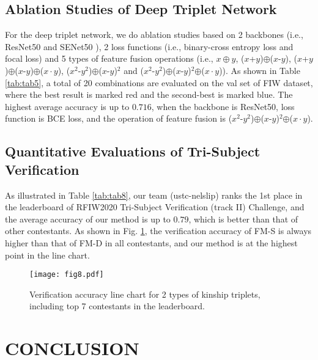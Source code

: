 \documentclass[a4paper, 10pt, conference]{ieeeconf}      %
\begin{document}
\subsection{Ablation Studies of Deep Triplet Network}

For the deep triplet network, we do ablation studies based on 2 backbones (i.e., ResNet50 \cite{c20} and SENet50 \cite{c21}), 2 loss functions (i.e., binary-cross entropy loss and focal loss) and 5 types of feature fusion operations (i.e., $x \oplus y$, ($x$+$y$)$\oplus$($x$-$y$), ($x$+$y$)$\oplus$($x$-$y$)$\oplus$($x\cdot y$), ($x^2$-$y^2$)$\oplus$($x$-$y$)$^2$ and ($x^2$-$y^2$)$\oplus$($x$-$y$)$^2$$\oplus$($x\cdot y$)). As shown in Table \ref{tab:tab5}, a total of 20 combinations are evaluated on the val set of FIW dataset, where the best result is marked red and the second-best is marked blue. The highest average accuracy is up to $0.716$, when the backbone is ResNet50, loss function is BCE loss, and the operation of feature fusion is ($x^2$-$y^2$)$\oplus$($x$-$y$)$^2$$\oplus$($x\cdot y$).


\subsection{Quantitative Evaluations of Tri-Subject Verification}

As illustrated in Table \ref{tab:tab8}, our team (ustc-nelslip) ranks the 1st place in the leaderboard of RFIW2020 Tri-Subject Verification (track II) Challenge, and the average accuracy of our method is up to $0.79$, which is better than that of other contestants. As shown in  Fig. \ref{fig:fig8}, the verification accuracy of FM-S is always higher than that of FM-D in all contestants, and our method is at the highest point in the line chart.

\begin{figure}[t]
\setlength{\abovecaptionskip}{0.1cm}
\setlength{\belowcaptionskip}{0.0cm}
\begin{minipage}[b]{1.0\linewidth}
  \centering
  \centerline{\texttt{[image: fig8.pdf]}}
\end{minipage}
\caption{Verification accuracy line chart for 2 types of kinship triplets, including top 7 contestants in the leaderboard.}
\label{fig:fig8}
\end{figure}


\section{CONCLUSION}
\end{document}
